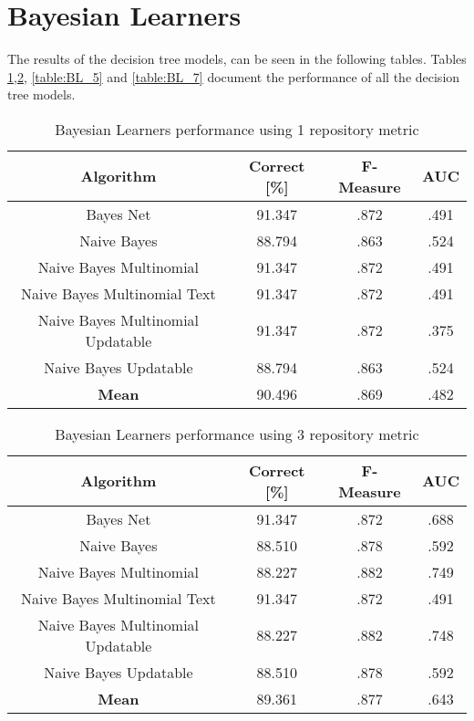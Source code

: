 \section{Bayesian Learners}
The results of the decision tree models, can be seen in the following tables. Tables \ref{table:BL_1},\ref{table:BL_3}, \ref{table:BL_5} and \ref{table:BL_7} document the performance of all the decision tree models.
\begin{table}[h!]
\centering
\begin{tabular}{ |c|c|c|c| }
 \hline
 \textbf{Algorithm} & \textbf{Correct [\%]} & \textbf{F-Measure} & \textbf{AUC}  \\
 \hline
 Bayes Net & 91.347 & .872 & .491    \\
 \hline
 Naive Bayes &  88.794 & .863 & .524   \\
 \hline
  Naive Bayes Multinomial & 91.347 & .872 & .491\\
 \hline
  Naive Bayes Multinomial Text & 91.347 & .872 & .491  \\
 \hline
  Naive Bayes Multinomial Updatable & 91.347 & .872 & .375 \\
 \hline
  Naive Bayes Updatable & 88.794 & .863 & .524 \\
 \hline
 \textbf{Mean}  & 90.496 & .869 & .482 \\
 \hline

\end{tabular}
\caption{Bayesian Learners performance using 1 repository metric}
\label{table:BL_1}
\end{table}

\begin{table}[h!]
\centering
\begin{tabular}{ |c|c|c|c| }
 \hline
 \textbf{Algorithm} & \textbf{Correct [\%]} & \textbf{F-Measure} & \textbf{AUC}  \\
 \hline
 Bayes Net & 91.347 & .872 & .688    \\
 \hline
 Naive Bayes &  88.510 & .878 & .592   \\
 \hline
  Naive Bayes Multinomial & 88.227 & .882 & .749\\
 \hline
  Naive Bayes Multinomial Text & 91.347 & .872 & .491  \\
 \hline
  Naive Bayes Multinomial Updatable & 88.227 & .882 & .748 \\
 \hline
  Naive Bayes Updatable & 88.510 & .878 & .592 \\
 \hline
 \textbf{Mean}  & 89.361 & .877 & .643 \\
 \hline
\end{tabular}
\caption{Bayesian Learners performance using 3 repository metric}
\label{table:BL_3}
\end{table}

